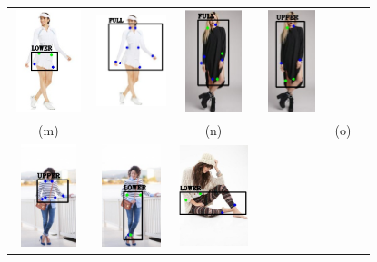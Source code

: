 \documentclass[conference]{IEEEtran}
\begin{document}
\begin{figure}
\begin{tabular} {cccccc}
{\includegraphics[align=c,  width = 0.8in, height= 3cm]{images/gt_14.PNG}} &
{\includegraphics[align=c, width = 0.8in, height= 3cm]{images/p_14.PNG}} &
{\includegraphics[align=c, width = 0.7in, height= 3cm]{images/gt_15.PNG}} &
{\includegraphics[align=c,  width = 0.7in, height= 3cm]{images/p_15.PNG}} \\
(m) &  & (n) & & (o) &\\
{\includegraphics[align=c, width = 0.7in, height= 3cm]{images/gt_16.PNG}} &
{\includegraphics[align=c, width = 0.7in, height= 3cm]{images/p_16.PNG}} &
{\includegraphics[align=c, width = 0.8in, height= 3cm]{images/gt_17.PNG}} &

\end{tabular}
\end{figure}
\end{document}
